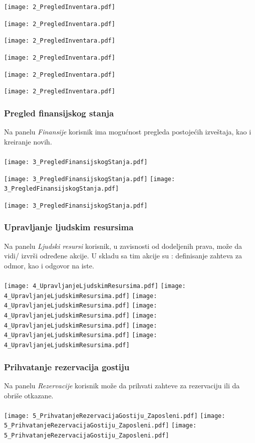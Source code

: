 \documentclass{article}
\begin{document}
\texttt{[image: 2\_PregledInventara.pdf]}

\texttt{[image: 2\_PregledInventara.pdf]}

\texttt{[image: 2\_PregledInventara.pdf]}

\texttt{[image: 2\_PregledInventara.pdf]}

\texttt{[image: 2\_PregledInventara.pdf]}

\texttt{[image: 2\_PregledInventara.pdf]}

\newpage
\subsubsection{Pregled finansijskog stanja}
Na panelu \emph{Finansije} korisnik ima mogućnost pregleda postojećih izveštaja, kao i kreiranje novih.\\\\

\texttt{[image: 3\_PregledFinansijskogStanja.pdf]}

\texttt{[image: 3\_PregledFinansijskogStanja.pdf]}
\texttt{[image: 3\_PregledFinansijskogStanja.pdf]}

\texttt{[image: 3\_PregledFinansijskogStanja.pdf]}
 \newpage
\subsubsection{Upravljanje ljudskim resursima}
Na panelu \emph{Ljudski resursi} korisnik, u zavisnosti od dodeljenih prava, može da vidi/ izvrši određene akcije. U skladu sa tim akcije su : definisanje zahteva za odmor, kao i odgovor na iste.\\\\
\texttt{[image: 4\_UpravljanjeLjudskimResursima.pdf]}
 \vfill
\texttt{[image: 4\_UpravljanjeLjudskimResursima.pdf]}
\noindent
\texttt{[image: 4\_UpravljanjeLjudskimResursima.pdf]}
\texttt{[image: 4\_UpravljanjeLjudskimResursima.pdf]}
\texttt{[image: 4\_UpravljanjeLjudskimResursima.pdf]}
\texttt{[image: 4\_UpravljanjeLjudskimResursima.pdf]}
\texttt{[image: 4\_UpravljanjeLjudskimResursima.pdf]}
\subsubsection{Prihvatanje rezervacija gostiju}
Na panelu \emph{Rezervacije} korisnik može da prihvati zahteve za rezervaciju ili da obriše otkazane.\\\\
 \texttt{[image: 5\_PrihvatanjeRezervacijaGostiju\_Zaposleni.pdf]}
\texttt{[image: 5\_PrihvatanjeRezervacijaGostiju\_Zaposleni.pdf]}
\vfill
\texttt{[image: 5\_PrihvatanjeRezervacijaGostiju\_Zaposleni.pdf]}
    
\end{document}
